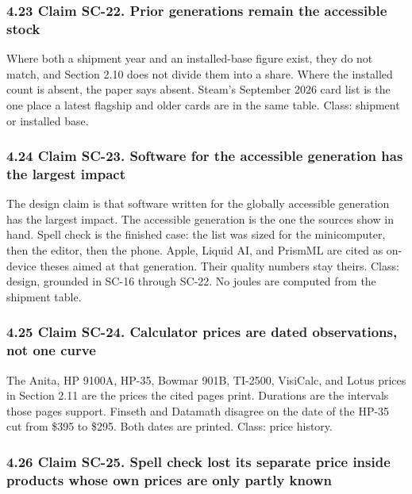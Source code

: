 \documentclass[
  10pt,
]{article}
\begin{document}
\subsubsection{4.23 Claim SC-22. Prior generations remain the accessible
stock}\label{claim-sc-22.-prior-generations-remain-the-accessible-stock}

Where both a shipment year and an installed-base figure exist, they do
not match, and Section 2.10 does not divide them into a share. Where the
installed count is absent, the paper says absent. Steam's September 2026
card list is the one place a latest flagship and older cards are in the
same table. Class: shipment or installed base.

\subsubsection{4.24 Claim SC-23. Software for the accessible generation
has the largest
impact}\label{claim-sc-23.-software-for-the-accessible-generation-has-the-largest-impact}

The design claim is that software written for the globally accessible
generation has the largest impact. The accessible generation is the one
the sources show in hand. Spell check is the finished case: the list was
sized for the minicomputer, then the editor, then the phone. Apple,
Liquid AI, and PrismML are cited as on-device theses aimed at that
generation. Their quality numbers stay theirs. Class: design, grounded
in SC-16 through SC-22. No joules are computed from the shipment table.

\subsubsection{4.25 Claim SC-24. Calculator prices are dated
observations, not one
curve}\label{claim-sc-24.-calculator-prices-are-dated-observations-not-one-curve}

The Anita, HP 9100A, HP-35, Bowmar 901B, TI-2500, VisiCalc, and Lotus
prices in Section 2.11 are the prices the cited pages print. Durations
are the intervals those pages support. Finseth and Datamath disagree on
the date of the HP-35 cut from \$395 to \$295. Both dates are printed.
Class: price history.

\subsubsection{4.26 Claim SC-25. Spell check lost its separate price
inside products whose own prices are only partly
known}\label{claim-sc-25.-spell-check-lost-its-separate-price-inside-products-whose-own-prices-are-only-partly-known}
\end{document}
